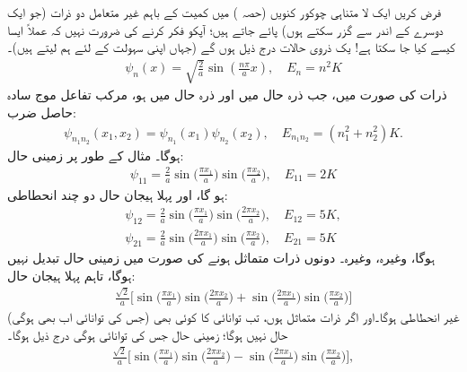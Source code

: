 

فرض کریں ایک لا متناہی چوکور کنویں (حصہ ) میں کمیت  کے باہم غیر متعامل دو ذرات (جو ایک دوسرے کے اندر سے گزر سکتے ہوں) پائے جاتے ہیں؛ آپکو فکر کرنے کی ضرورت نہیں کہ عملاً ایسا کیسے کیا جا سکتا ہے! یک ذروی حالات درج ذیل ہوں گے (جہاں اپنی سہولت کے لئے ہم  لیتے ہیں)۔
\begin{align*}
 \psi_{n} (x)=\sqrt{\frac{2}{a}}\sin(\tfrac{n \pi}{a}x), \quad E_{n}=n^2 K 
\end{align*}
 ذرات کی صورت میں، جب ذرہ  حال  میں اور ذرہ  حال  میں ہو، مرکب تفاعل موج سادہ حاصل ضرب:
\begin{align*}
 \psi_{n_{1} n_{2}} (x_{1},x_{2})=\psi_{n_{1}}(x_{1})\psi_{n_{2}}(x_{2}), \quad E_{n_{1} n_{2}}= (n_{1}^2+n_{2}^2)K. 
\end{align*}
 ہوگا۔ مثال کے طور پر زمینی حال:
\begin{align*}
 \psi_{11}=\frac{2}{a}\sin\big(\frac{\pi x_{1}}{a}\big) \sin\big(\frac{\pi x_{2}}{a}\big), \quad E_{11}=2K
\end{align*}
ہو گا، اور پہلا ہیجان حال دو چند انحطاطی:
\begin{align*}
 \psi_{12}=\frac{2}{a}\sin\big(\frac{\pi x_{1}}{a}\big) \sin\big(\frac{2\pi x_{2}}{a}\big), \quad E_{12}=5K, \\
\psi_{21}=\frac{2}{a}\sin\big(\frac{2\pi x_{1}}{a}\big) \sin\big(\frac{\pi x_{2}}{a}\big), \quad E_{21}=5K
\end{align*}
ہوگا، وغیرہ، وغیرہ۔ دونوں ذرات متماثل ہونے کی صورت میں زمینی حال تبدیل نہیں ہوگا، تاہم پہلا ہیجان حال:
\begin{align*}
\frac{\sqrt{2}}{a}\big[\sin\big(\frac{\pi x_{1}}{a}\big)\sin\big(\frac{2\pi x_{2}}{a}\big)+ \sin\big(\frac{2 \pi x_{1}}{a}\big)\sin\big(\frac{\pi x_{2}}{a}\big)\big]
\end{align*} 
 (جس کی توانائی اب بھی  ہوگی) غیر انحطاطی ہوگا۔اور اگر ذرات متماثل  ہوں، تب  توانائی کا کوئی بھی حال نہیں ہوگا؛ زمینی حال جس کی توانائی  ہوگی درج ذیل ہوگا۔
\begin{align*}
\frac{\sqrt{2}}{a}\big[\sin\big(\frac{\pi x_{1}}{a}\big) \sin\big(\frac{2 \pi x_{2}}{a}\big)- \sin\big(\frac{2 \pi x_{1}}{a}\big) \sin\big(\frac{\pi x_{2}}{a}\big)\big], 
\end{align*}
